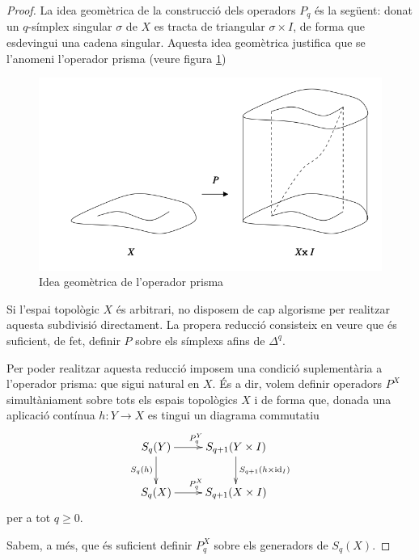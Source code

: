 \documentclass[../main.tex]{subfiles}
\begin{document}
\begin{proof}
La idea geomètrica de la construcció dels operadors $P_q$ és la següent: donat un $q$-símplex singular $\sigma$ de $X$ es tracta de triangular $\sigma\times I$, de forma que esdevingui una cadena singular. Aquesta idea geomètrica justifica que se l'anomeni l'operador prisma (veure figura \ref{fig:operadorprisma})
\begin{figure}
    \centering
    \includegraphics[scale = 0.25]{pictures/operadorprisma.png}
    \caption{Idea geomètrica de l'operador prisma}
    \label{fig:operadorprisma}
\end{figure}
Si l'espai topològic $X$ és arbitrari, no disposem de cap algorisme per realitzar aquesta subdivisió directament. La propera reducció consisteix en veure que és suficient, de fet, definir $P$ sobre els símplexs afins de $\Delta^q$.

Per poder realitzar aquesta reducció imposem una condició suplementària a l'operador prisma: que sigui natural en $X$. És a dir, volem definir operadors $P^X$ simultàniament sobre tots els espais topològics $X$ i de forma que, donada una aplicació contínua $h:Y\rightarrow X$ es tingui un diagrama commutatiu
\begin{equation}
    \notag
    \xymatrix{
    S_q(Y)\ar[r]^{P_q^Y}\ar[d]_{S_q(h)} & S_{q+1}(Y\times I)\ar[d]^{S_{q+1}(h\times \mathrm{id}_I)} \\
    S_q(X)\ar[r]^{P_q^X} & S_{q+1}(X\times I)
    }
\end{equation}
per a tot $q\geq 0$.

Sabem, a més, que és suficient definir $P_q^X$ sobre els generadors de $S_q(X)$.


\end{proof}
\end{document}
